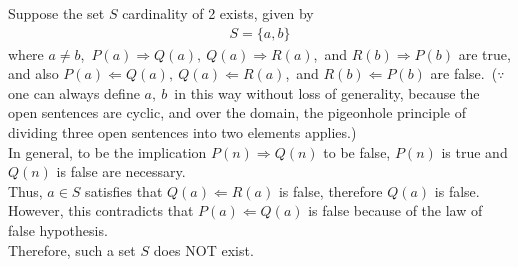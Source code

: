 \documentclass[12pt]{article}
\begin{document}
Suppose the set $S$ cardinality of 2 exists, given by 
\begin{gather*}
S = \{a,b\}
\end{gather*}
where $a\neq b$,~$P(a)\Rightarrow Q(a),~Q(a)\Rightarrow R(a)$,~and $R(b) \Rightarrow P(b)$ are true, and also $P(a)\Leftarrow Q(a),~Q(a)\Leftarrow R(a)$,~and $R(b) \Leftarrow P(b)$ are false.~($\because$ one can always define $a,~b$~in this way without loss of generality, because the open sentences are cyclic, and over the domain, the pigeonhole principle of dividing three open sentences into two elements applies.)\\[1em]
In general, to be the implication $P(n)\Rightarrow Q(n)$ to be false, $P(n)$ is true and $Q(n)$ is false are necessary.\\
Thus, $a \in S$ satisfies that $Q(a) \Leftarrow R(a)$ is false, therefore $Q(a)$ is false.\\[1em]
However, this contradicts that $P(a) \Leftarrow Q(a)$ is false because of the law of false hypothesis.\\[1em]
Therefore, such a set $S$ does NOT exist.
\end{document}
